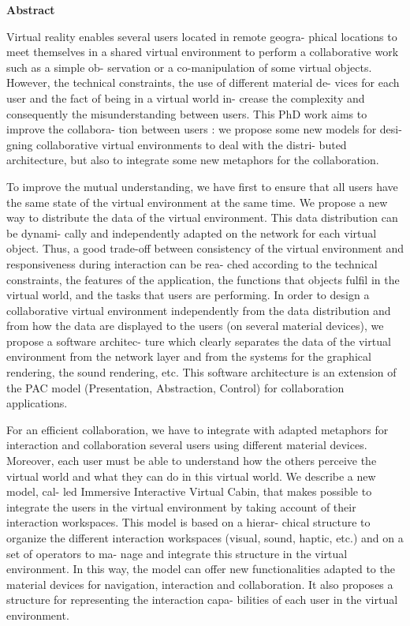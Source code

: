 \centerline{\LARGE \textbf{Abstract}}

\vspace*{\baselineskip}
Virtual reality enables several users located in remote geogra- phical locations to meet themselves in a shared virtual environment to perform a collaborative work such as a simple ob- servation or a co-manipulation of some virtual objects. However, the technical constraints, the use of different material de- vices for each user and the fact of being in a virtual world in- crease the complexity and consequently the misunderstanding between users. This PhD work aims to improve the collabora- tion between users : we propose some new models for desi- gning collaborative virtual environments to deal with the distri- buted architecture, but also to integrate some new metaphors for the collaboration.

To improve the mutual understanding, we have first to ensure that all users have the same state of the virtual environment at the same time. We propose a new way to distribute the data of the virtual environment. This data distribution can be dynami- cally and independently adapted on the network for each virtual object. Thus, a good trade-off between consistency of the virtual environment and responsiveness during interaction can be rea- ched according to the technical constraints, the features of the application, the functions that objects fulfil in the virtual world, and the tasks that users are performing. In order to design a collaborative virtual environment independently from the data distribution and from how the data are displayed to the users (on several material devices), we propose a software architec- ture which clearly separates the data of the virtual environment from the network layer and from the systems for the graphical rendering, the sound rendering, etc. This software architecture is an extension of the PAC model (Presentation, Abstraction, Control) for collaboration applications.

For an efficient collaboration, we have to integrate with adapted metaphors for interaction and collaboration several users using different material devices. Moreover, each user must be able to understand how the others perceive the virtual world and what they can do in this virtual world. We describe a new model, cal- led Immersive Interactive Virtual Cabin, that makes possible to integrate the users in the virtual environment by taking account of their interaction workspaces. This model is based on a hierar- chical structure to organize the different interaction workspaces (visual, sound, haptic, etc.) and on a set of operators to ma- nage and integrate this structure in the virtual environment. In this way, the model can offer new functionalities adapted to the material devices for navigation, interaction and collaboration. It also proposes a structure for representing the interaction capa- bilities of each user in the virtual environment.


